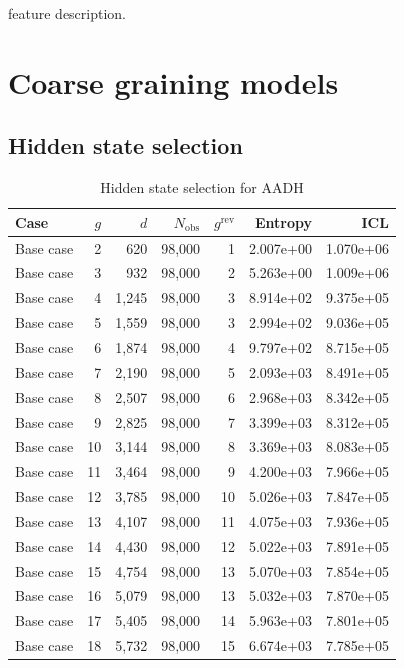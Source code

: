 feature description. 


\section{Coarse graining models}

\subsection{Hidden state selection}
\begin{table}[]
 \centering
 \caption{Hidden state selection for AADH}
 \begin{tabular}{lrrrrrr}
 \toprule
  Case & $g$ & $d$ & $N_{\mathrm{obs}}$ & $g^{\mathrm{rev}}$ & Entropy & ICL \\
 \midrule
  Base case & 2 & 620 &  98,000 &   1 & 2.007e+00 & 1.070e+06 \\
  Base case & 3 & 932 &  98,000 &   2 & 5.263e+00 & 1.009e+06 \\
  Base case & 4 & 1,245 &  98,000 &   3 & 8.914e+02 & 9.375e+05 \\
  Base case & 5 & 1,559 &  98,000 &   3 & 2.994e+02 & 9.036e+05 \\
  Base case & 6 & 1,874 &  98,000 &   4 & 9.797e+02 & 8.715e+05 \\
  Base case & 7 & 2,190 &  98,000 &   5 & 2.093e+03 & 8.491e+05 \\
  Base case & 8 & 2,507 &  98,000 &   6 & 2.968e+03 & 8.342e+05 \\
  Base case & 9 & 2,825 &  98,000 &   7 & 3.399e+03 & 8.312e+05 \\
  Base case & 10 & 3,144 &  98,000 &   8 & 3.369e+03 & 8.083e+05 \\
  Base case & 11 & 3,464 &  98,000 &   9 & 4.200e+03 & 7.966e+05 \\
  Base case & 12 & 3,785 &  98,000 &   10 & 5.026e+03 & 7.847e+05 \\
  Base case & 13 & 4,107 &  98,000 &   11 & 4.075e+03 & 7.936e+05 \\
  Base case & 14 & 4,430 &  98,000 &   12 & 5.022e+03 & 7.891e+05 \\
  Base case & 15 & 4,754 &  98,000 &   13 & 5.070e+03 & 7.854e+05 \\
  Base case & 16 & 5,079 &  98,000 &   13 & 5.032e+03 & 7.870e+05 \\
  Base case & 17 & 5,405 &  98,000 &   14 & 5.963e+03 & 7.801e+05 \\
  Base case & 18 & 5,732 &  98,000 &   15 & 6.674e+03 & 7.785e+05 \\

\end{tabular}
\end{table}
